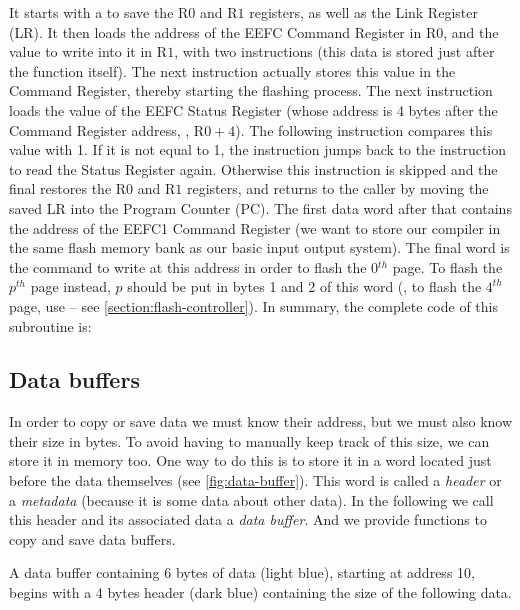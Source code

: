 It starts with a  to save the $\mathrm{R0}$ and $\mathrm{R1}$
registers, as well as the Link Register (LR). It then loads the address of the
EEFC Command Register in $\mathrm{R0}$, and the value to write into it in
$\mathrm{R1}$, with two  instructions (this data is stored just after
the function itself). The next instruction actually stores this value in the
Command Register, thereby starting the flashing process. The next 
instruction loads the value of the EEFC Status Register (whose address is 4
bytes after the Command Register address, \ie, $\mathrm{R0}+4$). The following
 instruction compares this value with 1. If it is not equal to 1, the
 instruction jumps back to the  instruction to read the Status
Register again. Otherwise this instruction is skipped and the final 
restores the $\mathrm{R0}$ and $\mathrm{R1}$ registers, and returns to the
caller by moving the saved LR into the Program Counter (PC). The first data
word after that contains the address of the EEFC1 Command Register (we want to
store our compiler in the same flash memory bank as our basic input output
system). The final word is the command to write at this address in order to
flash the 0$^{th}$ page. To flash the $p^{th}$ page instead, $p$ should be put
in bytes 1 and 2 of this word (\eg, to flash the $4^{th}$ page, use
 -- see \cref{section:flash-controller}). In summary, the
complete code of this subroutine is:


\subsection{Data buffers}\label{subsection:data-buffer}

In order to copy or save data we must know their address, but we must also know
their size in bytes. To avoid having to manually keep track of this size, we
can store it in memory too. One way to do this is to store it in a word located
just before the data themselves (see \cref{fig:data-buffer}). This word is
called a {\em header} or a {\em metadata} (because it is some data about other
data). In the following we call this header and its associated data a {\em data
buffer}. And we provide functions to copy and save data buffers.

\begin{Figure}
  

  \caption{A data buffer containing 6 bytes of data (light blue), starting at
  address 10, begins with a 4 bytes header (dark blue) containing the size of
  the following data.}\label{fig:data-buffer}
\end{Figure}

